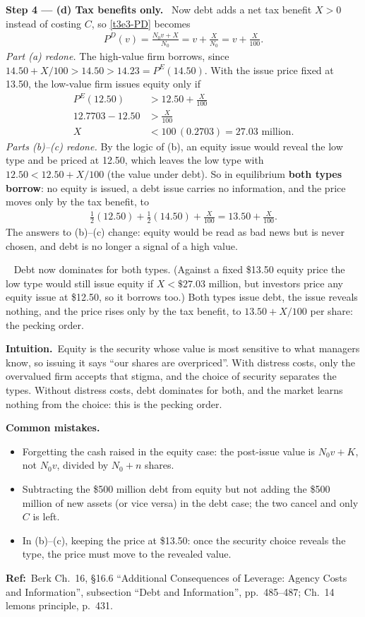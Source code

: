 \documentclass[11pt,a4paper]{article}
\newcommand{\step}[2]{\par\medskip\noindent\textbf{Step #1 --- #2.}~}
\newcommand{\intuition}{\par\medskip\noindent\textbf{Intuition.}~}
\newcommand{\refbib}{\par\smallskip\noindent\textbf{Ref:}~}
\newcommand{\answer}[1]{\par\smallskip\noindent\fbox{\textbf{Answer #1.}}~}
\newcommand{\pitfalls}{\par\medskip\noindent\textbf{Common mistakes.}}
\begin{document}
\step{4}{(d) Tax benefits only} Now debt adds a net tax benefit $X>0$ instead of costing $C$, so \eqref{t3e3-PD} becomes
\begin{align}
  P^D(v) = \frac{N_0v+X}{N_0} = v+\frac{X}{N_0} = v+\frac{X}{100}. \nonumber
\end{align}
\textit{Part (a) redone.} The high-value firm borrows, since $14.50+X/100>14.50>14.23=P^E(14.50)$. With the issue price fixed at 13.50, the low-value firm issues equity only if
\begin{align}
  P^E(12.50) &> 12.50 + \frac{X}{100} \nonumber\\
  12.7703 - 12.50 &> \frac{X}{100} \nonumber\\
  X &< 100\,(0.2703) = 27.03 \text{ million}. \label{t3e3-X}
\end{align}
\textit{Parts (b)--(c) redone.} By the logic of (b), an equity issue would reveal the low type and be priced at 12.50, which leaves the low type with $12.50<12.50+X/100$ (the value under debt). So in equilibrium \textbf{both types borrow}: no equity is issued, a debt issue carries no information, and the price moves only by the tax benefit, to
\begin{align}
  \tfrac12(12.50)+\tfrac12(14.50)+\frac{X}{100} = 13.50+\frac{X}{100}. \nonumber
\end{align}
The answers to (b)--(c) change: equity would be read as bad news but is never chosen, and debt is no longer a signal of a high value.

\answer{(d)} Debt now dominates for both types. (Against a fixed \$13.50 equity price the low type would still issue equity if $X<\$27.03$ million, but investors price any equity issue at \$12.50, so it borrows too.) Both types issue debt, the issue reveals nothing, and the price rises only by the tax benefit, to $13.50+X/100$ per share: the pecking order.

\intuition Equity is the security whose value is most sensitive to what managers know, so issuing it says ``our shares are overpriced''. With distress costs, only the overvalued firm accepts that stigma, and the choice of security separates the types. Without distress costs, debt dominates for both, and the market learns nothing from the choice: this is the pecking order.

\pitfalls
\begin{itemize}
  \item Forgetting the cash raised in the equity case: the post-issue value is $N_0v+K$, not $N_0v$, divided by $N_0+n$ shares.
  \item Subtracting the \$500 million debt from equity but not adding the \$500 million of new assets (or vice versa) in the debt case; the two cancel and only $C$ is left.
  \item In (b)--(c), keeping the price at \$13.50: once the security choice reveals the type, the price must move to the revealed value.
\end{itemize}
\refbib{Berk Ch.~16, \S16.6 ``Additional Consequences of Leverage: Agency Costs and Information'', subsection ``Debt and Information'', pp.~485--487; Ch.~14 lemons principle, p.~431.}
\end{document}
